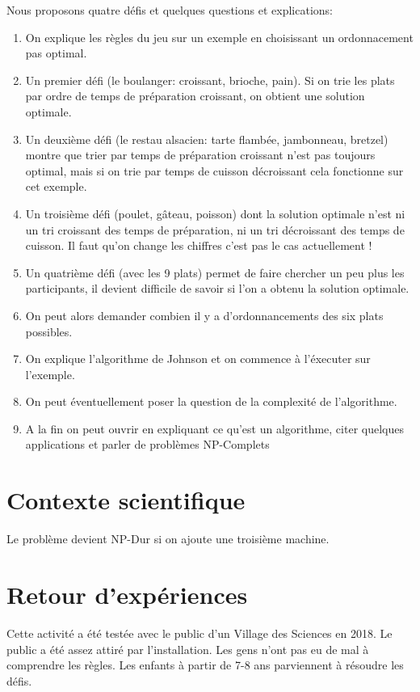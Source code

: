 \documentclass[a4paper]{article}
\begin{document}
Nous proposons quatre défis et quelques questions et explications:
\begin{enumerate}
\item On explique les règles du jeu sur un exemple en choisissant un ordonnacement pas optimal.
\item Un premier défi (le boulanger: croissant, brioche, pain). Si on trie les plats par ordre de temps de préparation croissant, on obtient une solution optimale.
\item Un deuxième défi (le restau alsacien: tarte flambée, jambonneau, bretzel) montre que trier par temps de préparation croissant n'est pas toujours optimal, mais si on trie par temps de cuisson décroissant cela fonctionne sur cet exemple.
\item Un troisième défi (poulet, gâteau, poisson) dont la solution optimale n'est ni un tri croissant des temps de préparation, ni un tri décroissant des temps de cuisson.
{\huge Il faut qu'on change les chiffres c'est pas le cas actuellement !}
\item Un quatrième défi (avec les 9 plats) permet de faire chercher un peu plus les participants, il devient difficile de savoir si l'on a obtenu la solution optimale.
\item On peut alors demander combien il y a d'ordonnancements des six plats possibles.
\item On explique l'algorithme de Johnson et on commence à l'éxecuter sur l'exemple.
\item On peut éventuellement poser la question de la complexité de l'algorithme.
\item A la fin on peut ouvrir en expliquant ce qu'est un algorithme, citer quelques applications et parler de problèmes NP-Complets 
\end{enumerate}

\section{Contexte scientifique}

Le problème devient NP-Dur si on ajoute une troisième machine.
\cite{baker2013principles} \cite{johnson1954optimal}

\section{Retour d'expériences}

Cette activité a été testée avec le public d'un Village des Sciences en 2018. Le public a été assez attiré par l'installation. Les gens n'ont pas eu de mal à comprendre les règles. Les enfants à partir de 7-8 ans parviennent à résoudre les défis.
\end{document}
